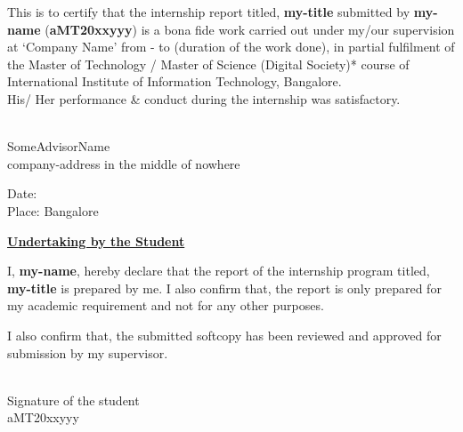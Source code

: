 \documentclass[english,a4paper,11pt]{report}
\newcommand{\reporttitle}{my-title}
\newcommand{\studentname}{my-name}
\newcommand{\rollnumber}{aMT20xxyyy}
\newcommand{\advisorname}{SomeAdvisorName}
\newcommand{\companyaddress}{company-address in the middle of nowhere}
\begin{document}
	\large
	\noindent This is to certify that the internship report titled, \textbf{\reporttitle} submitted by \textbf{\studentname} (\textbf{\rollnumber}) is a bona fide work carried out under my/our supervision at ‘Company Name’ from - to 	(duration of the work done), in partial fulfilment of the Master of Technology / Master of Science (Digital Society)* course of International Institute of Information Technology,	Bangalore.\\
	
	\noindent His/ Her performance \& conduct during the internship was satisfactory.
	
	\vspace*{6cm}
	\begin{flushright}
		\makebox[2.5in]{\hrulefill}\\
		\advisorname\\
		\companyaddress\\
	\end{flushright}
	
	\vspace*{3cm}
	\noindent Date: \\
	\noindent Place: Bangalore \\
	\clearpage
	
	\newpage
	
	\thispagestyle{empty}
	\begin{center}
		\Large
		\underline{\textbf{Undertaking by the Student}}
		\vspace{1cm}
	\end{center}
	
	\large
	\noindent I, \textbf{\studentname}, hereby declare that the report of the internship program titled,	\textbf{\reporttitle} is prepared by me. I also confirm that, the report is only prepared for my academic requirement and not for any other purposes.
	
	\vspace*{0.5cm}
	\noindent I also confirm that, the submitted softcopy has been reviewed and approved for submission by my supervisor.
	
	\vspace*{2cm}
	\begin{flushright}
		\makebox[2.5in]{\hrulefill}\\
		Signature of the student\\
		\rollnumber
	\end{flushright}
	
\end{document}
